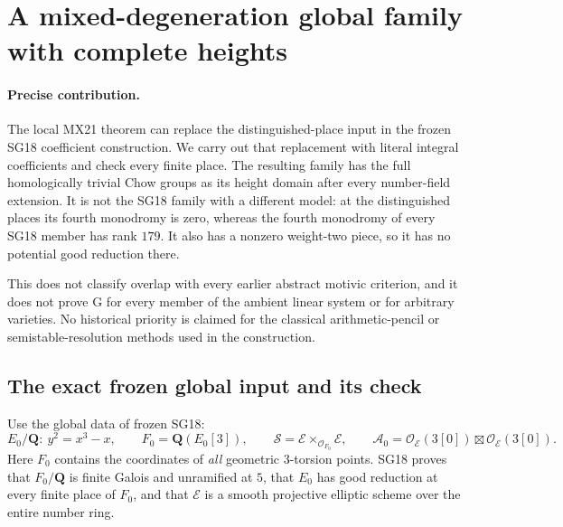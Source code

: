 \section{A mixed-degeneration global family with complete heights}
\label{r21mg:section}

\paragraph{Precise contribution.}
The local MX21 theorem can replace the distinguished-place input in
the frozen SG18 coefficient construction.  We carry out that
replacement with literal integral coefficients and check every finite
place.  The resulting family has the full homologically trivial Chow
groups as its height domain after every number-field extension.
It is not the SG18 family with a different model: at the distinguished
places its fourth monodromy is zero, whereas the fourth monodromy of
every SG18 member has rank $179$.  It also has a nonzero weight-two
piece, so it has no potential good reduction there.

This does not classify overlap with every earlier abstract motivic
criterion, and it does not prove G for every member of the ambient
linear system or for arbitrary varieties.  No historical priority is
claimed for the classical arithmetic-pencil or semistable-resolution
methods used in the construction.

\subsection{The exact frozen global input and its check}

Use the global data of frozen SG18:
\[
 E_0/\mathbf Q:\ y^2=x^3-x,\qquad
 F_0=\mathbf Q(E_0[3]),\qquad
 \mathcal S=\mathcal E\times_{\mathcal O_{F_0}}\mathcal E,
 \qquad
 \mathcal A_0=\mathcal O_{\mathcal E}(3[0])
                     \boxtimes\mathcal O_{\mathcal E}(3[0]).
 \tag{MG21.1}\label{r21mg:surface}
\]
Here $F_0$ contains the coordinates of \emph{all} geometric
$3$-torsion points.  SG18 proves that $F_0/\mathbf Q$ is finite
Galois and unramified at $5$, that $E_0$ has good reduction at
every finite place of $F_0$, and that $\mathcal E$ is a smooth
projective elliptic scheme over the entire number ring.

